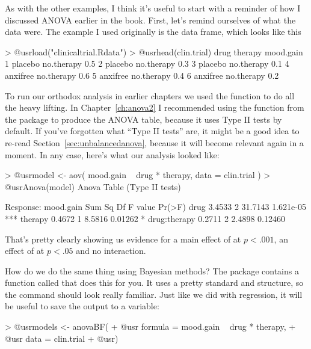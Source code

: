 
As with the other examples, I think it's useful to start with a reminder of how I discussed ANOVA earlier in the book. First, let's remind ourselves of what the data were. The example I used originally is the  data frame, which looks like this

\begin{rblock1}
> @usr{load("clinicaltrial.Rdata")}
> @usr{head(clin.trial)}
      drug    therapy mood.gain
1  placebo no.therapy       0.5
2  placebo no.therapy       0.3
3  placebo no.therapy       0.1
4 anxifree no.therapy       0.6
5 anxifree no.therapy       0.4
6 anxifree no.therapy       0.2
\end{rblock1}

\noindent
To run our orthodox analysis in earlier chapters we used the  function to do all the heavy lifting. In Chapter~\ref{ch:anova2} I recommended using the  function from the  package to produce the ANOVA table, because it uses Type II tests by default. If you've forgotten what ``Type II tests'' are, it might be a good idea to re-read Section~\ref{sec:unbalancedanova}, because it will become relevant again in a moment. In any case, here's what our analysis looked like:
\begin{rblock1}
> @usr{model <- aov( mood.gain ~ drug * therapy, data = clin.trial )}
> @usr{Anova(model)}
Anova Table (Type II tests)

Response: mood.gain
             Sum Sq Df F value    Pr(>F)    
drug         3.4533  2 31.7143 1.621e-05 ***
therapy      0.4672  1  8.5816   0.01262 *  
drug:therapy 0.2711  2  2.4898   0.12460             
\end{rblock1}
That's pretty clearly showing us evidence for a main effect of  at $p<.001$, an effect of  at $p<.05$ and no interaction. 


How do we do the same thing using Bayesian methods? The  package contains a function called  that does this for you. It uses a pretty standard  and  structure, so the command should look really familiar. Just like we did with regression, it will be useful to save the output to a variable:
\begin{rblock1}
> @usr{models <- anovaBF( }
+ @usr{  formula = mood.gain ~ drug * therapy,}
+ @usr{  data = clin.trial}
+ @usr{)}
\end{rblock1}

